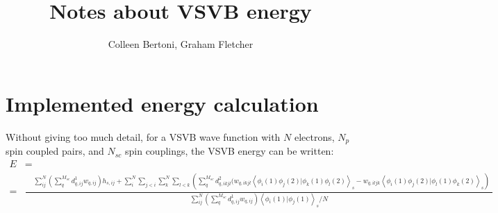 \documentclass[a4paper]{article}
\title{\vspace{-2.0cm}Notes about VSVB energy}
\author{\vspace{-2.0cm}Colleen Bertoni, Graham Fletcher}
\begin{document}
\maketitle



\section{Implemented energy calculation}

Without giving too much detail, for a VSVB wave function with $N$ electrons,  $N_p$ spin coupled pairs, and $N_{sc}$ spin couplings, the VSVB energy can be written:
\begin{equation}
 \begin{aligned}
 E &= \\
 =& \frac{ 
  \begin{aligned} &\sum_{ij}^{N} (\sum_q^{M_{sc}} d^1_{q,ij} w_{q,ij} ) h_{s,ij}                                                                                                                                               
    + \sum_i^{N}\sum_{j<i}\sum_k^{N}\sum_{l<k}                                                                                                                                                                               
         \left(\sum_q^{M_{sc}} d^2_{q,ikjl}                                                                                                                                                                                          
          (  w_{q,ikjl} \left< \phi_i(1) \phi_j(2) | \phi_k(1) \phi_l(2) \right>_s                                                                                                                                                                                  
           - w_{q,iljk} \left< \phi_i(1) \phi_j(2) | \phi_l(1) \phi_k(2) \right>_s \right) 
            \end{aligned}
     }
     { \displaystyle \sum_{ij}^{N} (\sum_q^{M_{sc}} d^1_{q,ij} w_{q,ij} ) \left< \phi_i(1) | \phi_j(1) \right>_s / N}                                                                                                                                                             
 \end{aligned}
 \end{equation}
\end{document}
